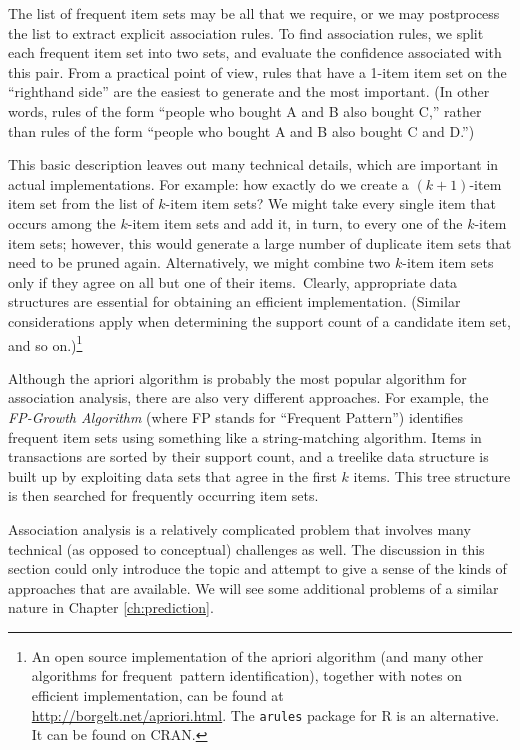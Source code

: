 The list of frequent item sets may be all that we require, or we may
postprocess the list to extract explicit association rules. To find
association rules, we split each frequent item set into two sets, and
evaluate the confidence associated with this pair. From a practical
point of view, rules that have a 1-item item set on the ``righthand
side'' are the easiest to generate and the most important. (In other
words, rules of the form ``people who bought A and B also bought C,''
rather than rules of the form ``people who bought A and B also bought
C and D.'')

This basic description leaves out many technical details, which are
important in actual implementations. For example: how exactly do we
create a $(k+1)$-item item set from the list of $k$-item item sets?
We might take every single item that occurs among the $k$-item item
sets and add it, in turn, to every one of the $k$-item item sets;
however, this would generate a large number of duplicate item sets
that need to be pruned again. Alternatively, we might combine two
$k$-item item sets only if they agree on all but one of their items.~Clearly, appropriate data structures are essential for obtaining an
efficient implementation.  (Similar considerations apply when
determining the support count of a candidate item set, and so
on.)\footnote{An open source implementation of the apriori algorithm
  (and many other algorithms for frequent~pattern identification),
  together with notes on efficient implementation, can be found at\\
  \url{http://borgelt.net/apriori.html}. The \texttt{\fontsize{7pt}{7pt}\selectfont arules} package for R is an alternative. It can be 
found on CRAN.}

Although the apriori algorithm is probably the most popular algorithm
for association analysis, there are also very different approaches.
For example, the \emph{FP-Growth Algorithm} (where FP stands for
``Frequent\vadjust{\pagebreak} Pattern'')  identifies frequent item sets using something
like a string-matching algorithm. Items in transactions are sorted by
their support count, and a treelike data structure is built up by
exploiting data sets that agree in the first $k$ items. This tree
structure is then searched for frequently occurring item sets.

Association analysis is a relatively complicated problem that involves
many technical (as opposed to conceptual) challenges as well. The
discussion in this section could only introduce the topic and attempt
to give a sense of the kinds of approaches that are available. We will
see some additional problems of a similar nature in Chapter
\ref{ch:prediction}.

